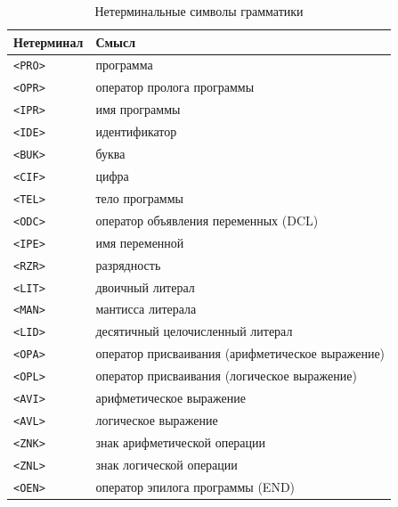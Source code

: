\documentclass[a4paper,14pt]{extarticle}
\begin{document}
\begin{table}[H]
\centering
\caption{Нетерминальные символы грамматики}
\label{tab:nonterm}
\begin{tabularx}{\textwidth}{|l|X|}
  \hline
  \textbf{Нетерминал} & \textbf{Смысл} \\
  \hline
  \texttt{<PRO>} & программа \\
  \texttt{<OPR>} & оператор пролога программы \\
  \texttt{<IPR>} & имя программы \\
  \texttt{<IDE>} & идентификатор \\
  \texttt{<BUK>} & буква \\
  \texttt{<CIF>} & цифра \\
  \texttt{<TEL>} & тело программы \\
  \texttt{<ODC>} & оператор объявления переменных (DCL) \\
  \texttt{<IPE>} & имя переменной \\
  \texttt{<RZR>} & разрядность \\
  \texttt{<LIT>} & двоичный литерал \\
  \texttt{<MAN>} & мантисса литерала \\
  \texttt{<LID>} & десятичный целочисленный литерал \\
  \texttt{<OPA>} & оператор присваивания (арифметическое выражение) \\
  \texttt{<OPL>} & оператор присваивания (логическое выражение) \\
  \texttt{<AVI>} & арифметическое выражение \\
  \texttt{<AVL>} & логическое выражение \\
  \texttt{<ZNK>} & знак арифметической операции \\
  \texttt{<ZNL>} & знак логической операции \\
  \texttt{<OEN>} & оператор эпилога программы (END) \\
  \hline
\end{tabularx}
\end{table}
\end{document}
